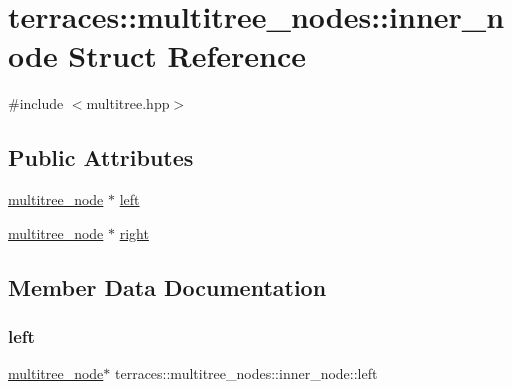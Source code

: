 \hypertarget{structterraces_1_1multitree__nodes_1_1inner__node}{}\section{terraces\+:\+:multitree\+\_\+nodes\+:\+:inner\+\_\+node Struct Reference}
\label{structterraces_1_1multitree__nodes_1_1inner__node}


{\ttfamily \#include $<$multitree.\+hpp$>$}

\subsection*{Public Attributes}
\begin{DoxyCompactItemize}
\item 
\hyperlink{structterraces_1_1multitree__node}{multitree\+\_\+node} $\ast$ \hyperlink{structterraces_1_1multitree__nodes_1_1inner__node_af0f33b9c24c2c273e714db3cd1ab6afd}{left}
\item 
\hyperlink{structterraces_1_1multitree__node}{multitree\+\_\+node} $\ast$ \hyperlink{structterraces_1_1multitree__nodes_1_1inner__node_a987c6beaaf17adc09dc8e2366986ad61}{right}
\end{DoxyCompactItemize}


\subsection{Member Data Documentation}
\mbox{\label{structterraces_1_1multitree__nodes_1_1inner__node_af0f33b9c24c2c273e714db3cd1ab6afd}} 
\subsubsection{\texorpdfstring{left}{left}}
{\footnotesize\ttfamily \hyperlink{structterraces_1_1multitree__node}{multitree\+\_\+node}$\ast$ terraces\+::multitree\+\_\+nodes\+::inner\+\_\+node\+::left}

\mbox{\label{structterraces_1_1multitree__nodes_1_1inner__node_a987c6beaaf17adc09dc8e2366986ad61}} 
